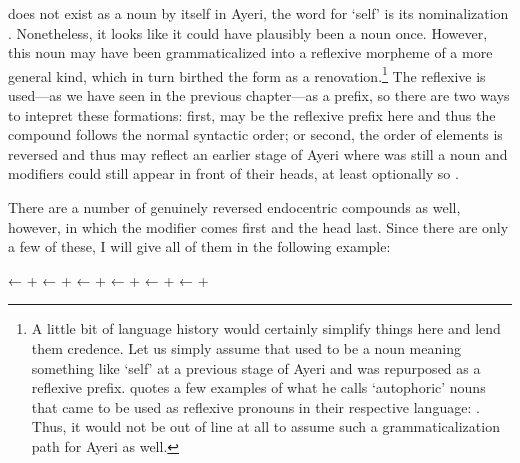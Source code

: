  does not exist as a noun by itself in Ayeri, the word for 
`self' is its nominalization . Nonetheless, it looks 
like it could have plausibly been a noun once. However, this noun 
may have been grammaticalized into a reflexive morpheme of a more 
general kind, which in turn birthed the form  as a 
renovation.\footnote{A little bit of language history would certainly simplify 
things here and lend them credence. Let us simply assume that 
 used to be a noun meaning something like `self' at a 
previous stage of Ayeri and was repurposed as a reflexive prefix. 
\citet{lehmann2015} quotes a few examples of what he calls `autophoric' nouns 
that came to be used as reflexive pronouns in their respective language: 
. Thus, it would not be out of 
line at all to assume such a grammaticalization path for Ayeri as well.} The 
reflexive  is used---as we have seen in the previous 
chapter---as a prefix, so there are two ways to intepret these formations: 
first,  may be the reflexive prefix here and thus the 
compound follows the normal syntactic order; or second, the order of elements 
is reversed and thus may reflect an earlier stage of Ayeri where 
 was still a noun and modifiers could still appear in front 
of their heads, at least optionally so \citep[133--137]{gaeta2008}.

There are a number of genuinely reversed endocentric compounds as well, 
however, in which the modifier comes first and the head last. Since there are 
only a few of these, I will give all of them in the following example:

\pex
	\a {}
		← 
		+ 
	\a {}
		← 
		+ 
	\a {}
		← 
		+ 
	\a {}
		← 
		+ 
	\a {}
		← 
		+ 
	\a {}
		← 
		+ \ques{}\,
\xe

